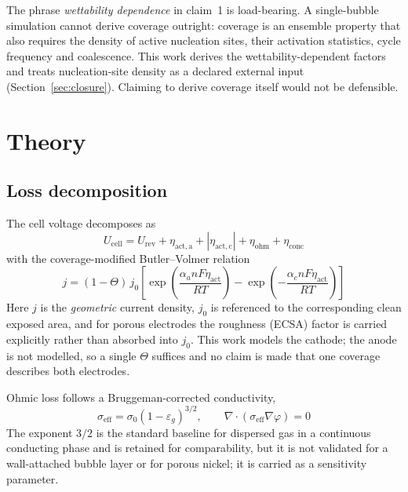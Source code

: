 \documentclass[11pt,a4paper]{article}
\begin{document}
The phrase \emph{wettability dependence} in claim~1 is load-bearing. A single-bubble simulation
cannot derive coverage outright: coverage is an ensemble property that also requires the density of
active nucleation sites, their activation statistics, cycle frequency and coalescence. This work
derives the wettability-dependent factors and treats nucleation-site density as a declared external
input (Section~\ref{sec:closure}). Claiming to derive coverage itself would not be defensible.

\section{Theory}\label{sec:theory}

\subsection{Loss decomposition}
The cell voltage decomposes as
\begin{equation}
U_{\mathrm{cell}} = U_{\mathrm{rev}} + \eta_{\mathrm{act,a}} + |\eta_{\mathrm{act,c}}|
+ \eta_{\mathrm{ohm}} + \eta_{\mathrm{conc}}
\end{equation}
with the coverage-modified Butler--Volmer relation
\begin{equation}
j = (1-\Theta)\, j_0 \left[\exp\!\left(\frac{\alpha_a n F \eta_{\mathrm{act}}}{RT}\right)
- \exp\!\left(-\frac{\alpha_c n F \eta_{\mathrm{act}}}{RT}\right)\right]
\label{eq:bv}
\end{equation}
Here $j$ is the \emph{geometric} current density, $j_0$ is referenced to the corresponding clean
exposed area, and for porous electrodes the roughness (ECSA) factor is carried explicitly rather than
absorbed into $j_0$. This work models the cathode; the anode is not modelled, so a single $\Theta$
suffices and no claim is made that one coverage describes both electrodes.

Ohmic loss follows a Bruggeman-corrected conductivity,
\begin{equation}
\sigma_{\mathrm{eff}} = \sigma_0 (1-\varepsilon_g)^{3/2},
\qquad \nabla\!\cdot\!\left(\sigma_{\mathrm{eff}}\nabla\varphi\right)=0
\label{eq:brugg}
\end{equation}
The exponent $3/2$ is the standard baseline for dispersed gas in a continuous conducting phase and is
retained for comparability, but it is not validated for a wall-attached bubble layer or for porous
nickel; it is carried as a sensitivity parameter.
\end{document}
